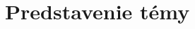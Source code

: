 \documentclass[main.tex]{subfiles}
\begin{document}
	
\section{Predstavenie témy}	
	
\end{document}
